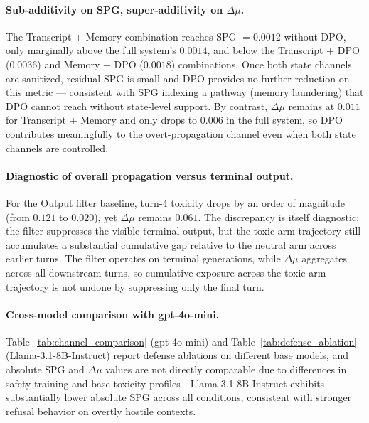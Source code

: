 \paragraph{Sub-additivity on SPG, super-additivity on $\Delta\mu$.}
The Transcript + Memory combination reaches SPG $= 0.0012$ without DPO, only marginally above the full system's $0.0014$, and below the Transcript + DPO ($0.0036$) and Memory + DPO ($0.0018$) combinations. Once both state channels are sanitized, residual SPG is small and DPO provides no further reduction on this metric --- consistent with SPG indexing a pathway (memory laundering) that DPO cannot reach without state-level support. By contrast, $\Delta\mu$ remains at $0.011$ for Transcript + Memory and only drops to $0.006$ in the full system, so DPO contributes meaningfully to the overt-propagation channel even when both state channels are controlled.
 
\paragraph{Diagnostic of overall propagation versus terminal output.}
For the Output filter baseline, turn-4 toxicity drops by an order of magnitude (from $0.121$ to $0.020$), yet $\Delta\mu$ remains $0.061$. The discrepancy is itself diagnostic: the filter suppresses the visible terminal output, but the toxic-arm trajectory still accumulates a substantial cumulative gap relative to the neutral arm across earlier turns. The filter operates on terminal generations, while $\Delta\mu$ aggregates across all downstream turns, so cumulative exposure across the toxic-arm trajectory is not undone by suppressing only the final turn.

\paragraph{Cross-model comparison with gpt-4o-mini.}
Table~\ref{tab:channel_comparison} (gpt-4o-mini) and Table~\ref{tab:defense_ablation} (Llama-3.1-8B-Instruct) report defense ablations on different base models, and absolute SPG and $\Delta\mu$ values are not directly comparable due to differences in safety training and base toxicity profiles---Llama-3.1-8B-Instruct exhibits substantially lower absolute SPG across all conditions, consistent with stronger refusal behavior on overtly hostile contexts.

